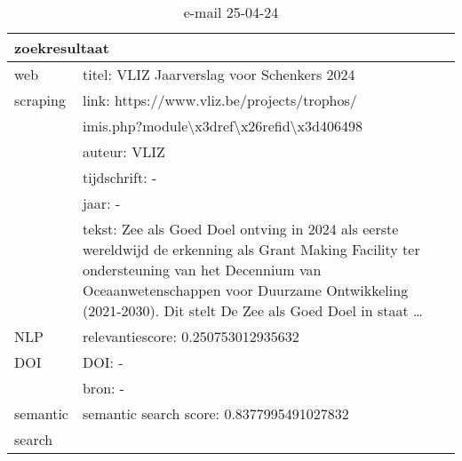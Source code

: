 \begin{table}[h!]
    \caption{e-mail 25-04-24}
    \centering
    \begin{tabularx}{\textwidth}{|p{4cm}|X|} 
        \hline
        \multicolumn{2}{|X|}{\textbf{zoekresultaat}} \\
        \hline
        web &titel: VLIZ Jaarverslag voor Schenkers 2024\\
        scraping&link: https://www.vliz.be/projects/trophos/\\&imis.php?module\textbackslash x3dref\textbackslash x26refid\textbackslash x3d406498\\
        &auteur: VLIZ\\
        &tijdschrift: -\\
        &jaar: -\\
        &tekst: Zee als Goed Doel ontving in 2024 als eerste wereldwijd de erkenning als Grant Making Facility ter ondersteuning van het Decennium van Oceaanwetenschappen voor Duurzame Ontwikkeling (2021-2030). Dit stelt De Zee als Goed Doel in staat …\\
        \hline
        NLP&relevantiescore: 0.250753012935632\\
        \hline
        DOI&DOI: -\\
        &bron: -\\
        \hline
        semantic&semantic search score: 0.8377995491027832\\
        search&\\
        \hline
    \end{tabularx}
    \label{table:email20250424}
\end{table}
